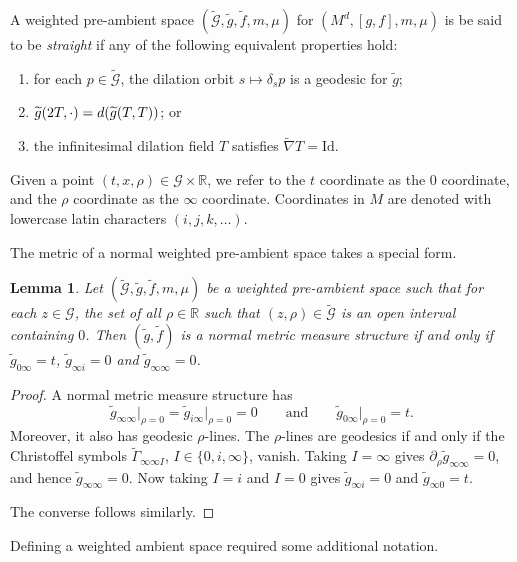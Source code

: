 \documentclass[11pt]{article}
\numberwithin{equation}{section}
\newcommand{\cg}{\widetilde{g}}
\newcommand{\cf}{\widetilde{f}}
\newcommand{\cmG}{\widetilde{\mathcal{G}}}
\newcommand{\mG}{\mathcal{G}}
\newcommand{\bR}{\mathbb{R}}
\numberwithin{equation}{section}
\newtheorem{Lemma}[Theorem]{Lemma}
\begin{document}
\begin{Definition}
A weighted pre-ambient space $(\cmG,\cg,\cf,m,\mu)$ for $(M^d,[g,f],m,\mu)$ is be said to be \textit{straight} if any of the following equivalent properties hold:
\begin{enumerate}[label=$(\roman*)$]\itemsep=0pt
 \item for each $p\in \widetilde{\mathcal{G}}$, the dilation orbit $s\mapsto \delta_s p$ is a geodesic for $\widetilde{g}$;

 \item $\widetilde{g}(2T,\cdot)={\rm d}(\widetilde{g}(T,T))$; or

\item the infinitesimal dilation field $T$ satisfies $\widetilde{\nabla}T=\mathrm{Id}$.
\end{enumerate}
\end{Definition}

Given a point $(t,x,\rho)\in \mathcal{G}\times \bR$, we refer to the $t$ coordinate as the $0$ coordinate, and the $\rho$ coordinate as the $\infty$ coordinate. Coordinates in $M$ are denoted with lowercase latin characters $(i,j,k,\dots)$.

The metric of a normal weighted pre-ambient space takes a special form.

\begin{Lemma}
\label{straight-metric-lemma}
Let $(\cmG,\cg,\cf,m,\mu)$ be a weighted pre-ambient space such that for each $z\in\mG$, the set of all $\rho\in\bR$ such that $(z,\rho)\in\cmG$ is an open interval containing $0$. Then $(\cg,\cf)$ is a \textit{normal} metric measure structure if and only if $\cg_{0\infty}=t$, $\cg_{\infty i}=0$ and $\cg_{\infty\infty}=0$.
\end{Lemma}

\begin{proof}
A normal metric measure structure has
\[
\widetilde{g}_{\infty\infty}\big|_{\rho=0}=\widetilde{g}_{i\infty}\big|_{\rho=0}=0 \qquad\text{and}\qquad \widetilde{g}_{0\infty}\big|_{\rho=0}=t.
\]
Moreover, it also has geodesic $\rho$-lines. The $\rho$-lines are geodesics if and only if the Christoffel symbols $\widetilde{\Gamma}_{\infty \infty I}$, $I\in \{0,i,\infty\}$, vanish. Taking $I=\infty$ gives $\partial_{\rho} \widetilde{g}_{\infty \infty}=0$, and hence $\widetilde{g}_{\infty \infty}=0 .$ Now taking $I=i$ and $I=0$ gives $\widetilde{g}_{\infty i}=0$ and $\widetilde{g}_{\infty 0}=t$.

The converse follows similarly.
\end{proof}
Defining a weighted ambient space required some additional notation.
\end{document}
